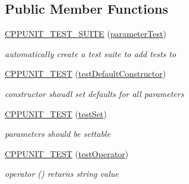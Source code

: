 \subsection*{Public Member Functions}
\begin{DoxyCompactItemize}
\item 
\mbox{\label{classparameterTest_a10e241ba4df333675089b47d53738345}} 
\mbox{\hyperlink{classparameterTest_a10e241ba4df333675089b47d53738345}{C\+P\+P\+U\+N\+I\+T\+\_\+\+T\+E\+S\+T\+\_\+\+S\+U\+I\+TE}} (\mbox{\hyperlink{classparameterTest}{parameter\+Test}})
\begin{DoxyCompactList}\small\item\em automatically create a test suite to add tests to \end{DoxyCompactList}\item 
\mbox{\label{classparameterTest_aae669ac4378b05b1f3a46973382cdac8}} 
\mbox{\hyperlink{classparameterTest_aae669ac4378b05b1f3a46973382cdac8}{C\+P\+P\+U\+N\+I\+T\+\_\+\+T\+E\+ST}} (\mbox{\hyperlink{classparameterTest_a80bc49c4dafb3b6ae5c7e561b5711583}{test\+Default\+Constructor}})
\begin{DoxyCompactList}\small\item\em constructor shoudl set defaults for all parameters \end{DoxyCompactList}\item 
\mbox{\label{classparameterTest_a21c4cabbb339e5d6af1e69628b57596f}} 
\mbox{\hyperlink{classparameterTest_a21c4cabbb339e5d6af1e69628b57596f}{C\+P\+P\+U\+N\+I\+T\+\_\+\+T\+E\+ST}} (\mbox{\hyperlink{classparameterTest_ae8748da779947e5ddac496a38e1b07b8}{test\+Set}})
\begin{DoxyCompactList}\small\item\em parameters should be settable \end{DoxyCompactList}\item 
\mbox{\label{classparameterTest_a409fee522f591e3ea4a24bc4d4f6931d}} 
\mbox{\hyperlink{classparameterTest_a409fee522f591e3ea4a24bc4d4f6931d}{C\+P\+P\+U\+N\+I\+T\+\_\+\+T\+E\+ST}} (\mbox{\hyperlink{classparameterTest_a099ef3c9d0a74ada96f9dd8bd4c168e6}{test\+Operator}})
\begin{DoxyCompactList}\small\item\em operator () returns string value \end{DoxyCompactList}\item 

\end{DoxyCompactItemize}
